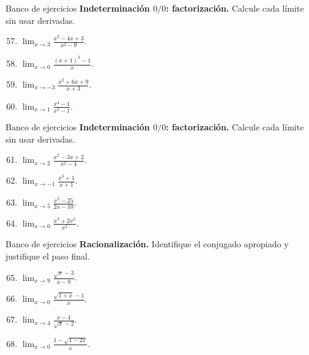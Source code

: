\documentclass[12pt,aspectratio=169]{beamer}
\begin{document}
\begin{frame}[t,allowframebreaks]{Banco de ejercicios}
\small
\noindent \textbf{Indeterminación $0/0$: factorización.} Calcule cada límite sin usar derivadas.\par\smallskip
\begin{enumerate}\setcounter{enumi}{56}
\item $\displaystyle\lim_{x\to3}\frac{x^2-4x+3}{x^2-9}$.
\item $\displaystyle\lim_{x\to0}\frac{(x+1)^3-1}{x}$.
\item $\displaystyle\lim_{x\to-3}\frac{x^2+6x+9}{x+3}$.
\item $\displaystyle\lim_{x\to1}\frac{x^4-1}{x^2-1}$.
\end{enumerate}
\end{frame}


\begin{frame}[t,allowframebreaks]{Banco de ejercicios}
\small
\noindent \textbf{Indeterminación $0/0$: factorización.} Calcule cada límite sin usar derivadas.\par\smallskip
\begin{enumerate}\setcounter{enumi}{60}
\item $\displaystyle\lim_{x\to2}\frac{x^2-3x+2}{x^2-4}$.
\item $\displaystyle\lim_{x\to-1}\frac{x^3+1}{x+1}$.
\item $\displaystyle\lim_{x\to5}\frac{x^2-25}{2x-10}$.
\item $\displaystyle\lim_{x\to0}\frac{x^3+2x^2}{x^2}$.
\end{enumerate}
\end{frame}


\begin{frame}[t,allowframebreaks]{Banco de ejercicios}
\small
\noindent \textbf{Racionalización.} Identifique el conjugado apropiado y justifique el paso final.\par\smallskip
\begin{enumerate}\setcounter{enumi}{64}
\item $\displaystyle\lim_{x\to9}\frac{\sqrt{x}-3}{x-9}$.
\item $\displaystyle\lim_{x\to0}\frac{\sqrt{1+x}-1}{x}$.
\item $\displaystyle\lim_{x\to4}\frac{x-4}{\sqrt{x}-2}$.
\item $\displaystyle\lim_{x\to0}\frac{1-\sqrt{1-2x}}{x}$.
\end{enumerate}
\end{frame}
\end{document}
